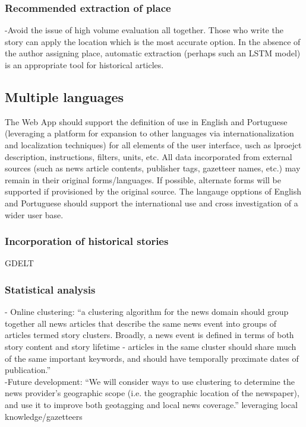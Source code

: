 \subsubsection{Recommended extraction of place}
-{\color{purple}Avoid the issue of high volume evaluation all together. Those who write the story can apply the location which is the most accurate option. In the absence of the author assigning place, automatic extraction (perhaps such an LSTM model) is an appropriate tool for historical articles.\cite{Halterman2019}}\\

\subsection{Multiple languages}
The Web App should support the definition of use in English and Portuguese (leveraging a platform for expansion to other languages via internationalization and localization techniques) for all elements of the user interface, usch as lproejct description, instructions, filters, units, etc. All data incorporated from external sources (such as news article contents, publisher tags, gazetteer names, etc.) may remain in their original forms/languages. If possible, alternate forms will be supported if provisioned by the original source. The langauge opptions of English and Portuguese should support the international use and cross investigation of a wider user base.

\subsubsection{Incorporation of historical stories}
GDELT

\subsubsection{Statistical analysis}
-{\color{orange} Online clustering: “a clustering algorithm for the news domain should group together all news articles that describe the same news event into groups of articles termed story clusters. Broadly, a news event is defined in terms of both story content and story lifetime - articles in the same cluster should share much of the same important keywords, and should have temporally proximate dates of publication.”\cite{Teitler2008}}\\
-{\color{orange}Future development: “We will consider ways to use clustering to determine the news provider’s geographic scope (i.e. the geographic location of the newspaper), and use it to improve both geotagging and local news coverage.” }{\color{purple}leveraging local knowledge/gazetteers}\cite{Teitler2008}\\

